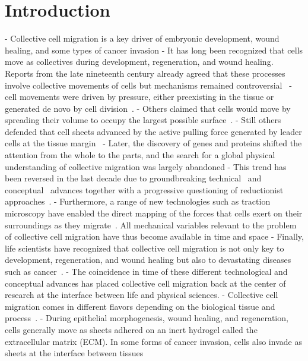 \section{Introduction}
- Collective cell migration is a key driver of embryonic development, wound healing, and some types of cancer invasion
- It has long been recognized that cells move as collectives during development, regeneration, and wound healing.
Reports from the late nineteenth century already agreed that these processes involve collective movements of cells but mechanisms remained controversial~\cite{alert2020, holmes1914, herrick1932, vaughan1966}
- cell movements were driven by pressure, either preexisting in the tissue or generated de novo by cell division~\cite{herrick1932}. 
- Others claimed that cells would move by spreading their volume to occupy the largest possible surface~\cite{alert2020}.
- Still others defended that cell sheets advanced by the active pulling force generated by leader cells at the tissue margin~\cite{holmes1914}
- Later, the discovery of genes and proteins shifted the attention from the whole to the parts, and the search for a global physical understanding of collective migration was largely abandoned
- This trend has been reversed in the last decade due to groundbreaking technical~\cite{roca2017} and conceptual~\cite{marchetti2013, prost2015, julicher2018} advances together with a progressive questioning of reductionist approaches~\cite{good2018}.
- Furthermore, a range of new technologies such as traction microscopy have enabled the direct mapping of the forces that cells exert on their surroundings as they migrate~\cite{du2005, trepat2009}. All mechanical variables relevant to the problem of collective cell migration have thus become available in time and space
- Finally, life scientists have recognized that collective cell migration is not only key to development, regeneration, and wound healing but also to devastating diseases such as cancer~\cite{friedl1995}.
- The coincidence in time of these different technological and conceptual advances has placed collective cell migration back at the center of research at the interface between life and physical sciences.
- Collective cell migration comes in different flavors depending on the biological tissue and process~\cite{friedl2009}.
- During epithelial morphogenesis, wound healing, and regeneration, cells generally move as sheets adhered on an inert hydrogel called the extracellular matrix (ECM). In some forms of cancer invasion, cells also invade as sheets at the interface between tissues 
